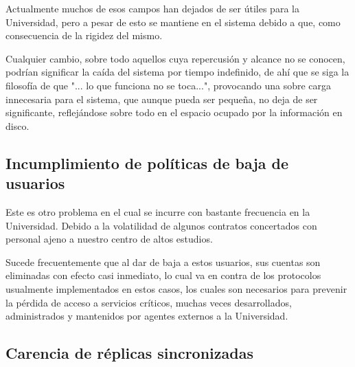 Actualmente muchos de esos campos han dejados de ser \'utiles para la Universidad, pero a pesar de esto se mantiene en el sistema debido a que, como consecuencia de la rigidez del mismo. 

Cualquier cambio, sobre todo aquellos cuya repercusi\'on y alcance no se conocen, podr\'ian significar la ca\'ida del sistema por tiempo indefinido, de ah\'i que se siga la filosof\'ia de que "... lo que funciona no se toca...", provocando una sobre carga innecesaria para el sistema, que aunque pueda ser pequeña, no deja de ser significante, reflej\'andose sobre todo en el espacio ocupado por la informaci\'on en disco.

\subsection{Incumplimiento de pol\'iticas de baja de usuarios}

Este es otro problema en el cual se incurre con bastante frecuencia en la Universidad. Debido a la volatilidad de algunos contratos concertados con personal ajeno a nuestro centro de altos estudios. 

Sucede frecuentemente que al dar de baja a estos usuarios, sus cuentas son eliminadas con efecto casi inmediato, lo cual va en contra de los protocolos usualmente implementados en estos casos, los cuales son necesarios para prevenir la p\'erdida de acceso a servicios cr\'iticos, muchas veces desarrollados, administrados y mantenidos por agentes externos a la Universidad. 


\subsection{Carencia de r\'eplicas sincronizadas }

